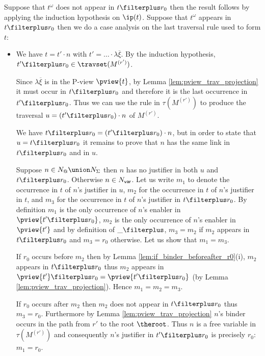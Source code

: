     Suppose that $t^\omega$ does not appear in $t \filterplus r_0$ then
    the result follows by applying the induction hypothesis on $\ip(t)$.
    Suppose that $t^\omega$ appears in $t \filterplus r_0$ then we do a case analysis on the last traversal rule used to form $t$:
      \begin{itemize}
    \item {}
        We have  $t = t' \cdot n$ with $t' = \ldots \cdot \lambda \overline{\xi}$. By the
        induction hypothesis, $t' \filterplus r_0 \in
        \travset(M^{(r')})$.

        Since $\lambda \overline{\xi}$ is in the P-view
        $\pview{t}$, by Lemma \ref{lem:pview_trav_projection} it
        must occur in $t\filterplus r_0$ and therefore it is the
        last occurrence in $t'\filterplus r_0$. Thus we can use
        the rule  in $\tau(M^{(r')})$ to produce
        the traversal $u = (t'\filterplus r_0) \cdot n$ of
        $M^{(r')}$.

        We have $t \filterplus r_0 = (t'\filterplus r_0) \cdot n$,
         but in order to state that $u = t \filterplus r_0$
         it remains to prove that $n$ has the same link in $t \filterplus r_0$ and in $u$.

        Suppose $n \in N_@ \union N_\Sigma$ then $n$ has no justifier in both $u$ and $t\filterplus r_0$.
        Otherwise $n \in N_{\sf var}$.
        Let us write $m_1$ to denote the occurrence in $t$ of $n$'s justifier in $u$,
        $m_2$ for the occurrence in $t$ of $n$'s justifier in $t$,
        and $m_3$ for the occurrence in $t$ of $n$'s justifier in $t \filterplus r_0$.
        By definition $m_1$ is the only occurrence of $n$'s enabler in $\pview{t'\filterplus r_0}$,
        $m_2$ is the only occurrence of $n$'s enabler in $\pview{t'}$
        and by definition of $\_ \filterplus$, $m_3 = m_2$ if $m_2$ appears in
        $t \filterplus r_0$ and $m_3 = r_0$ otherwise.
        Let us show that $m_1 = m_3$.

        If $r_0$ occurs before $m_2$ then by Lemma
        \ref{lem:if_binder_beforeafter_r0}(i), $m_2$ appears in
        $t \filterplus r_0$ thus $m_2$ appears in $\pview{t'}
        \filterplus r_0 = \pview{t'\filterplus r_0}$ (by Lemma
        \ref{lem:pview_trav_projection}). Hence $m_1 = m_2 =
        m_3$.

        If $r_0$ occurs after $m_2$ then $m_2$ does not appear
        in $t\filterplus r_0$ thus $m_3 = r_0$. Furthermore by
        Lemma \ref{lem:pview_trav_projection}
    $n$'s binder occurs in the path from $r'$ to the root $\theroot$. Thus
    $n$ is a free variable in $\tau(M^{(r')})$ and consequently
    $n$'s justifier in $t'\filterplus r_0$ is precisely $r_0$: $m_1 = r_0$.


\end{itemize}
